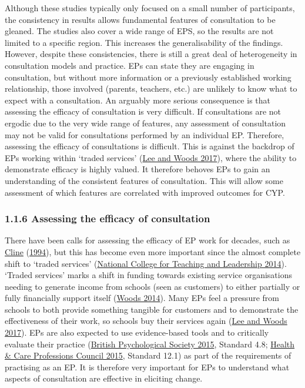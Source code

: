 \documentclass[
]{article}
\begin{document}
Although these studies typically only focused on a small number of
participants, the consistency in results allows fundamental features of
consultation to be gleaned. The studies also cover a wide range of EPS,
so the results are not limited to a specific region. This increases the
generalisability of the findings. However, despite these consistencies,
there is still a great deal of heterogeneity in consultation models and
practice. EPs can state they are engaging in consultation, but without
more information or a previously established working relationship, those
involved (parents, teachers, etc.) are unlikely to know what to expect
with a consultation. An arguably more serious consequence is that
assessing the efficacy of consultation is very difficult. If
consultations are not ergodic due to the very wide range of features,
any assessment of consultation may not be valid for consultations
performed by an individual EP. Therefore, assessing the efficacy of
consultations is difficult. This is against the backdrop of EPs working
within `traded services'
(\protect\hyperlink{ref-leeExplorationDevelopingRole2017}{Lee and Woods
2017}), where the ability to demonstrate efficacy is highly valued. It
therefore behoves EPs to gain an understanding of the consistent
features of consultation. This will allow some assessment of which
features are correlated with improved outcomes for CYP.

\hypertarget{assessing-the-efficacy-of-consultation}{%
\subsubsection{1.1.6 Assessing the efficacy of
consultation}\label{assessing-the-efficacy-of-consultation}}

There have been calls for assessing the efficacy of EP work for decades,
such as
\protect\hyperlink{ref-clineQualityAssuranceEducational1994a}{Cline}
(\protect\hyperlink{ref-clineQualityAssuranceEducational1994a}{1994}),
but this has become even more important since the almost complete shift
to `traded services'
(\protect\hyperlink{ref-nationalcollegeforteachingandleadershipEducationalPsychologyWorkforce2014}{National
College for Teaching and Leadership 2014}). `Traded services' marks a
shift in funding towards existing service organisations needing to
generate income from schools (seen as customers) to either partially or
fully financially support itself
(\protect\hyperlink{ref-woodsPreparationPractitionerEducational2014}{Woods
2014}). Many EPs feel a pressure from schools to both provide something
tangible for customers and to demonstrate the effectiveness of their
work, so schools buy their services again
(\protect\hyperlink{ref-leeExplorationDevelopingRole2017}{Lee and Woods
2017}). EPs are also expected to use evidence-based tools and to
critically evaluate their practice
(\protect\hyperlink{ref-britishpsychologicalsocietyQualityStandardsEducational2015}{British
Psychological Society 2015}, Standard 4.8;
\protect\hyperlink{ref-healthcareprofessionscouncilStandardsProficiencyPractitioner2015a}{Health
\& Care Professions Council 2015}, Standard 12.1) as part of the
requirements of practising as an EP. It is therefore very important for
EPs to understand what aspects of consultation are effective in
eliciting change.
\end{document}

